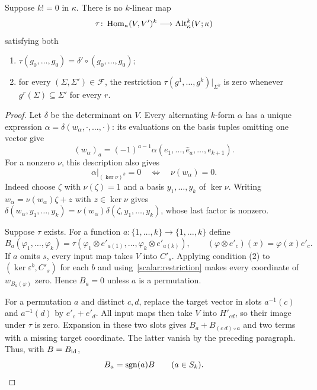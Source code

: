 \begin{lemma}\label{scalar:fibre}
Suppose $k! = 0$ in $\kappa$. There is no $k$\nobreakdash-linear map
\[
 \tau\colon\operatorname{Hom}_\kappa(V,V')^k\longrightarrow\operatorname{Alt}^k_\kappa(V;\kappa)
\]
satisfying both
\begin{enumerate}
\item $\tau(g_0,\dots,g_0)=\delta'\circ(g_0,\dots,g_0)$;
\item for every $(\Sigma,\Sigma')\in\mathcal F$, the restriction
$\tau(g^1,\dots,g^k)|_{\Sigma^k}$ is zero whenever $g^r(\Sigma)\subseteq\Sigma'$ for every $r$.
\end{enumerate}
\end{lemma}

\begin{proof}
Let $\delta$ be the determinant on $V$. Every alternating $k$\nobreakdash-form $\alpha$ has a unique expression
$\alpha=\delta(w_\alpha,\cdot,\dots,\cdot)$: its evaluations on the basis tuples omitting one vector give
\[
 (w_\alpha)_a=(-1)^{a-1}\alpha(e_1,\dots,\widehat e_a,\dots,e_{k+1}).
\]
For a nonzero $\nu$, this description also gives
\begin{equation}\label{scalar:restriction}
 \alpha|_{(\ker\nu)^k}=0\quad\Longleftrightarrow\quad\nu(w_\alpha)=0.
\end{equation}
Indeed choose $\zeta$ with $\nu(\zeta)=1$ and a basis $y_1,\dots,y_k$ of $\ker\nu$. Writing
$w_\alpha=\nu(w_\alpha)\zeta+z$ with $z\in\ker\nu$ gives
$\delta(w_\alpha,y_1,\dots,y_k)=\nu(w_\alpha)\delta(\zeta,y_1,\dots,y_k)$, whose last factor is nonzero.

Suppose $\tau$ exists. For a function $a\colon\{1,\dots,k\}\to\{1,\dots,k\}$ define
\[
 B_a(\varphi_1,\dots,\varphi_k)
 =\tau(\varphi_1\otimes e'_{a(1)},\dots,\varphi_k\otimes e'_{a(k)}),
 \qquad (\varphi\otimes e'_c)(x)=\varphi(x)e'_c.
\]
If $a$ omits $s$, every input map takes $V$ into $C'_s$. Applying condition (2) to
$(\ker\varepsilon^b,C'_s)$ for each $b$ and using~\eqref{scalar:restriction} makes every coordinate of
$w_{B_a(\varphi)}$ zero. Hence $B_a=0$ unless $a$ is a permutation.

For a permutation $a$ and distinct $c,d$, replace the target vector in slots $a^{-1}(c)$ and $a^{-1}(d)$
by $e'_c+e'_d$. All input maps then take $V$ into $H'_{cd}$, so their image under $\tau$ is zero.
Expansion in these two slots gives $B_a+B_{(c\ d)\circ a}$ and two terms with a missing target coordinate.
The latter vanish by the preceding paragraph. Thus, with $B=B_{\mathrm{id}}$,
\begin{equation}\label{scalar:target-sign}
 B_a=\operatorname{sgn}(a)B\qquad(a\in S_k).
\end{equation}


\end{proof}
